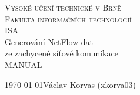 \documentclass[12pt]{article}
\begin{document}
\begin{titlepage}
\begin{center}

\Huge\textsc{Vysoké učení technické v Brně\\
\huge
Fakulta informačních technologií}\\
\LARGE ISA\\ 
\Huge Generování NetFlow dat\\ ze zachycené síťové komunikace\\
\Large MANUAL

\end{center}
\Large
\today \hfill Václav Korvas (xkorva03)
\end{titlepage}

\tableofcontents
\newpage
\end{document}
